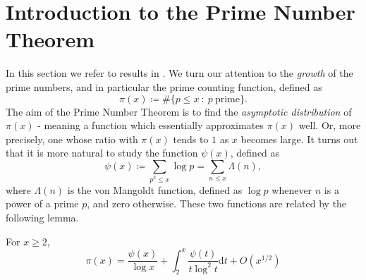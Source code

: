 \section{Introduction to the Prime Number Theorem}
In this section we refer to results in \cite{davenport, heath-brown_2005}. We turn our attention to the \textit{growth} of the prime numbers, and in particular the prime counting function, defined as
\begin{equation}
    \pi(x) \coloneqq \# \{p \leq x \ : \ p \ \textrm{prime}\}. \nonumber
\end{equation}
The aim of the Prime Number Theorem is to find the \textit{asymptotic distribution} of $\pi(x)$ - meaning a function which essentially approximates $\pi(x)$ well. Or, more precisely, one whose ratio with $\pi(x)$ tends to $1$ as $x$ becomes large. It turns out that it is more natural to study the function $\psi(x)$, defined as 
\begin{equation}
    \psi(x) \coloneqq \sum_{p^{k} \leq x} \log p = \sum_{n \leq x} \Lambda(n), \nonumber
\end{equation}
where $\Lambda(n)$ is the von Mangoldt function, defined as $\log p$ whenever $n$ is a power of a prime $p$, and zero otherwise. These two functions are related by the following lemma.
\begin{lemma}
For $x \geq 2$, 
\begin{equation}
\pi(x) = \frac{\psi(x)}{\log x} + \int_{2}^{x} \frac{\psi(t)}{t \log^{2} t} \mathrm{d} t + O(x^{1/2})
\end{equation}
\end{lemma}
